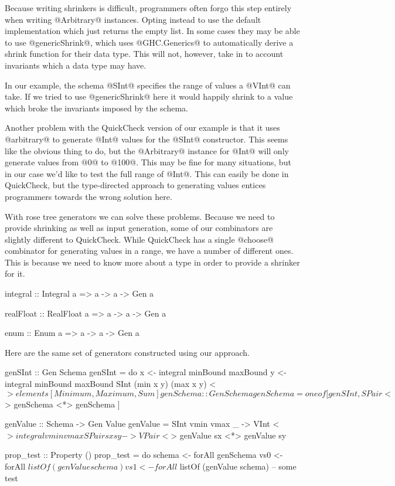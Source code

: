 Because writing shrinkers is difficult, programmers often forgo this step entirely when writing @Arbitrary@ instances. Opting instead to use the default implementation which just returns the empty list. In some cases they may be able to use @genericShrink@, which uses @GHC.Generics@ to automatically derive a shrink function for their data type. This will not, however, take in to account invariants which a data type may have. 

In our example, the schema @SInt@ specifies the range of values a @VInt@ can take. If we tried to use @genericShrink@ here it would happily shrink to a value which broke the invariants imposed by the schema.

Another problem with the QuickCheck version of our example is that it uses @arbitrary@ to generate @Int@ values for the @SInt@ constructor. This seems like the obvious thing to do, but the @Arbitrary@ instance for @Int@ will only generate values from @0@ to @100@. This may be fine for many situations, but in our case we'd like to test the full range of @Int@. This can easily be done in QuickCheck, but the type-directed approach to generating values entices programmers towards the wrong solution here. 

With rose tree generators we can solve these problems. Because we need to provide shrinking as well as input generation, some of our combinators are slightly different to QuickCheck. While QuickCheck has a single @choose@ combinator for generating values in a range, we have a number of different ones. This is because we need to know more about a type in order to provide a shrinker for it.

\begin{code}
  integral :: Integral a => a -> a -> Gen a

  realFloat :: RealFloat a => a -> a -> Gen a

  enum :: Enum a => a -> a -> Gen a
\end{code}

Here are the same set of generators constructed using our approach.

\begin{code}
  genSInt :: Gen Schema
  genSInt = do
    x <- integral minBound maxBound
    y <- integral minBound maxBound
    SInt (min x y) (max x y)
      <$> elements [Minimum, Maximum, Sum]

  genSchema :: Gen Schema
  genSchema =
    oneof [
        genSInt
      , SPair <$> genSchema <*> genSchema
      ]

  genValue :: Schema -> Gen Value
  genValue = \case
    SInt vmin vmax _ ->
      VInt <$> integral vmin vmax
    SPair sx sy ->
      VPair <$> genValue sx <*> genValue sy

  prop_test :: Property ()
  prop_test = do
    schema <- forAll genSchema
    vs0 <- forAll $ listOf (genValue schema)
    vs1 <- forAll $ listOf (genValue schema)
    -- some test
\end{code}

